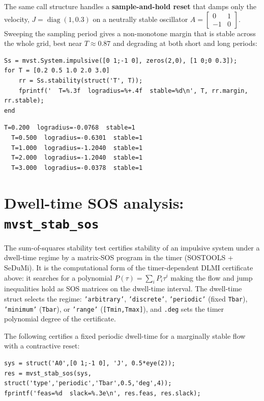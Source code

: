 \documentclass[11pt,oneside]{report}
\newcommand{\code}[1]{\texttt{#1}}
\begin{document}
The same call structure handles a \textbf{sample-and-hold reset} that damps only the
velocity, \(J=\operatorname{diag}(1,0.3)\) on a neutrally stable oscillator
\(A=\begin{bmatrix}0&1\\-1&0\end{bmatrix}\). Sweeping the sampling period gives a non-monotone margin that
is stable across the whole grid, best near \(T\approx0.87\) and degrading at both
short and long periods:

\begin{lstlisting}[style=matlabstyle]
Ss = mvst.System.impulsive([0 1;-1 0], zeros(2,0), [1 0;0 0.3]);
for T = [0.2 0.5 1.0 2.0 3.0]
    rr = Ss.stability(struct('T', T));
    fprintf('  T=%.3f  logradius=%+.4f  stable=%d\n', T, rr.margin, rr.stable);
end
\end{lstlisting}

\begin{lstlisting}[style=outputstyle]
  T=0.200  logradius=-0.0768  stable=1
  T=0.500  logradius=-0.6301  stable=1
  T=1.000  logradius=-1.2040  stable=1
  T=2.000  logradius=-1.2040  stable=1
  T=3.000  logradius=-0.0378  stable=1
\end{lstlisting}

\hypertarget{dwell-time-sos-analysis-mvst_stab_sos}{%
\section{\texorpdfstring{Dwell-time SOS analysis: \code{mvst\_stab\_sos}}{Dwell-time SOS analysis: mvst\_stab\_sos}}\label{dwell-time-sos-analysis-mvst_stab_sos}}

The sum-of-squares stability test certifies stability of an impulsive system
under a dwell-time regime by a matrix-SOS program in the timer (SOSTOOLS +
SeDuMi). It is the computational form of the timer-dependent DLMI certificate
above: it searches for a polynomial \(P(\tau)=\sum_i P_i\tau^{i}\) making the flow
and jump inequalities hold as SOS matrices on the dwell-time interval. The dwell-time
struct selects the regime: \code{'arbitrary'}, \code{'discrete'}, \code{'periodic'} (fixed
\code{Tbar}), \code{'minimum'} (\code{Tbar}), or \code{'range'} (\code{[Tmin,Tmax]}), and \code{.deg} sets the
timer polynomial degree of the certificate.

The following certifies a fixed periodic dwell-time for a marginally stable flow
with a contractive reset:

\begin{lstlisting}[style=matlabstyle]
sys = struct('A0',[0 1;-1 0], 'J', 0.5*eye(2));
res = mvst_stab_sos(sys, struct('type','periodic','Tbar',0.5,'deg',4));
fprintf('feas=%d  slack=%.3e\n', res.feas, res.slack);
\end{lstlisting}
\end{document}
